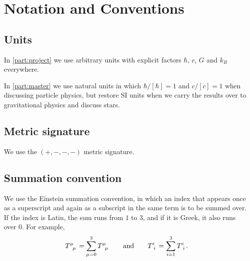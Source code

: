 \chapter{Notation and Conventions} %

\section*{Units}

In \cref{part:project} we use arbitrary units with explicit factors $\hbar$, $c$, $G$ and $k_B$ everywhere.

In \cref{part:master} we use natural units in which $\hbar / [\hbar] = 1$ and $c / [c] = 1$ when discussing particle physics,
but restore SI units when we carry the results over to gravitational physics and discuss stars.

\section*{Metric signature}

We use the $(+,-,-,-)$ metric signature.

\section*{Summation convention}

We use the Einstein summation convention, in which an index that appears once as a superscript and again as a subscript in the same term is to be summed over.
If the index is Latin, the sum runs from $1$ to $3$, and if it is Greek, it also runs over $0$.
For example,
\begin{equation*}
	T\indices{^\mu_\mu} = \sum_{\mu=0}^3 T\indices{^\mu_\mu}
	\qquad \text{and} \qquad
	T\indices{^i_i} = \sum_{i=1}^3 T\indices{^i_i}
	.
\end{equation*}

\iffalse
\section*{Fourier transformation}

We use the Fourier transformation convention
\begin{equation}
	f(k) = \int \dif x \, e^{i k x} f(x)
	\qquad \text{and} \qquad
	f(x) = \int \frac{\dif k}{2 \pi} \, e^{-i k x} f(k) .
\end{equation}
With this convention, the delta function $\delta(x' - x)$ is given by the highlighted part of
\begin{equation}
	f(x) = \int \frac{\dif k}{2 \pi} \, e^{-i k x} f(k)
	     = \int \dif x' \underbrace{\int \frac{\dif k}{2 \pi} \, e^{i k (x'-x)}}_{\displaystyle \delta(x'-x)} f(k) .
\label{eq:pre:delta_function}
\end{equation}
\fi
